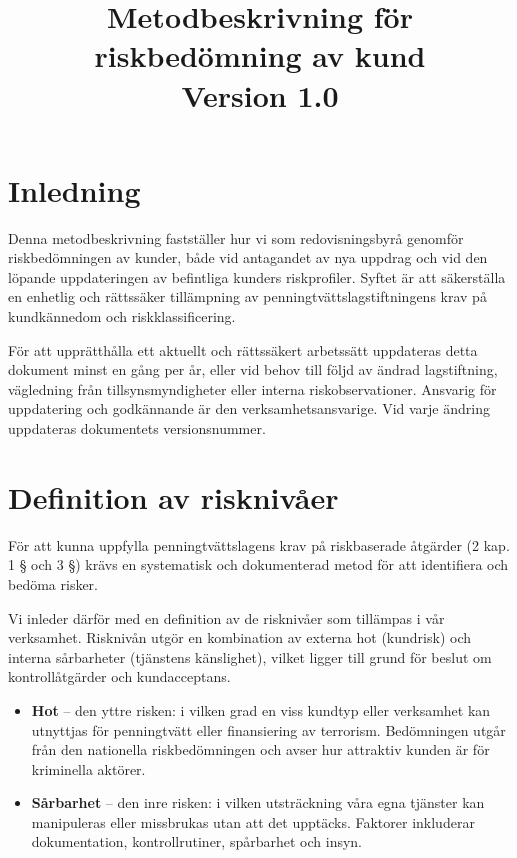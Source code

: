 \documentclass{article}
\title{Metodbeskrivning för riskbedömning av kund\\\large Version 1.0}
\begin{document}
\vspace{1em}

\maketitle
\tableofcontents
\newpage

\section*{Inledning}

Denna metodbeskrivning fastställer hur vi som redovisningsbyrå genomför riskbedömningen av kunder, både vid antagandet av nya uppdrag och vid den löpande uppdateringen av befintliga kunders riskprofiler. Syftet är att säkerställa en enhetlig och rättssäker tillämpning av penningtvättslagstiftningens krav på kundkännedom och riskklassificering.

För att upprätthålla ett aktuellt och rättssäkert arbetssätt uppdateras detta dokument minst en gång per år, eller vid behov till följd av ändrad lagstiftning, vägledning från tillsynsmyndigheter eller interna riskobservationer. Ansvarig för uppdatering och godkännande är den verksamhetsansvarige. Vid varje ändring uppdateras dokumentets versionsnummer.

\section*{Definition av risknivåer}

För att kunna uppfylla penningtvättslagens krav på riskbaserade åtgärder (2 kap. 1 § och 3 §) krävs en systematisk och dokumenterad metod för att identifiera och bedöma risker. 

Vi inleder därför med en definition av de risknivåer som tillämpas i vår verksamhet. Risknivån utgör en kombination av externa hot (kundrisk) och interna sårbarheter (tjänstens känslighet), vilket ligger till grund för beslut om kontrollåtgärder och kundacceptans.

\begin{itemize}[label=--]
  \item \textbf{Hot} – den yttre risken: i vilken grad en viss kundtyp eller verksamhet kan utnyttjas för penningtvätt eller finansiering av terrorism. Bedömningen utgår från den nationella riskbedömningen och avser hur attraktiv kunden är för kriminella aktörer.

  \item \textbf{Sårbarhet} – den inre risken: i vilken utsträckning våra egna tjänster kan manipuleras eller missbrukas utan att det upptäcks. Faktorer inkluderar dokumentation, kontrollrutiner, spårbarhet och insyn.
\end{itemize}
\end{document}
